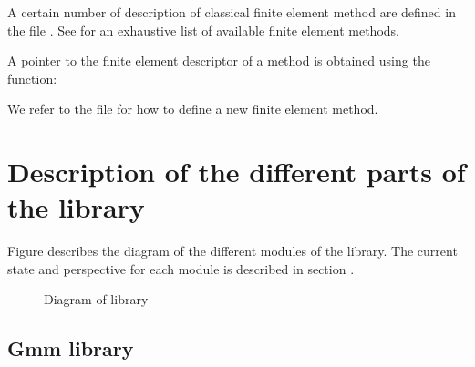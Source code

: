\documentclass[a4paper,11pt,english]{sphinxmanual}
\begin{document}
A certain number of description of classical finite element method are defined in
the file . See  for an exhaustive list of
available finite element methods.

A pointer to the finite element descriptor of a method is obtained using the
function:

\begin{sphinxVerbatim}[commandchars=\\\{\}]
   
\end{sphinxVerbatim}

We refer to the file  for how to define a new finite element
method.


\chapter{Description of the different parts of the library}
\label{\detokenize{project/libdesc:description-of-the-different-parts-of-the-library}}\label{\detokenize{project/libdesc:dp-libdesc}}\label{\detokenize{project/libdesc::doc}}
Figure {\hyperref[\detokenize{project/libdesc:dp-fig-diagram}]{}} describes the diagram of the different modules of
the  library. The current state and perspective for each module is
described in section {\hyperref[\detokenize{project/libdesc:dp-libdesc}]{}}.

\begin{figure}[htbp]
\centering
\capstart

\noindent{}
\caption{Diagram of  library}\label{\detokenize{project/libdesc:id1}}\label{\detokenize{project/libdesc:dp-fig-diagram}}\end{figure}


\section{Gmm library}
\label{\detokenize{project/libdesc_gmm:gmm-library}}\label{\detokenize{project/libdesc_gmm:dp-libdesc-gmm}}\label{\detokenize{project/libdesc_gmm::doc}}
\end{document}
